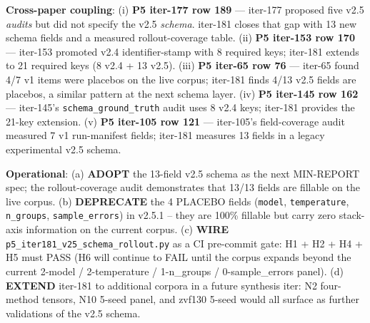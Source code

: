 \noindent\textbf{Cross-paper coupling}: (i) \textbf{P5 iter-177 row 189} ---
iter-177 proposed five v2.5 \emph{audits} but did not specify the v2.5
\emph{schema}. iter-181 closes that gap with 13 new schema fields and a
measured rollout-coverage table. (ii) \textbf{P5 iter-153 row 170} ---
iter-153 promoted v2.4 identifier-stamp with 8 required keys; iter-181
extends to 21 required keys (8 v2.4 + 13 v2.5). (iii) \textbf{P5 iter-65
row 76} --- iter-65 found 4/7 v1 items were placebos on the live corpus;
iter-181 finds 4/13 v2.5 fields are placebos, a similar pattern at the
next schema layer. (iv) \textbf{P5 iter-145 row 162} --- iter-145's
\texttt{schema\_ground\_truth} audit uses 8 v2.4 keys; iter-181 provides
the 21-key extension. (v) \textbf{P5 iter-105 row 121} --- iter-105's
field-coverage audit measured 7 v1 run-manifest fields; iter-181 measures 13
fields in a legacy experimental v2.5 schema.

\noindent\textbf{Operational}: (a) \textbf{ADOPT} the 13-field v2.5
schema as the next MIN-REPORT spec; the rollout-coverage audit
demonstrates that 13/13 fields are fillable on the live corpus.
(b) \textbf{DEPRECATE} the 4 PLACEBO fields (\texttt{model},
\texttt{temperature}, \texttt{n\_groups}, \texttt{sample\_errors})
in v2.5.1 -- they are 100\% fillable but carry zero stack-axis
information on the current corpus. (c) \textbf{WIRE}
\texttt{p5\_iter181\_v25\_schema\_rollout.py} as a CI pre-commit gate:
H1 + H2 + H4 + H5 must PASS (H6 will continue to FAIL until the corpus
expands beyond the current 2-model / 2-temperature / 1-n_groups /
0-sample_errors panel). (d) \textbf{EXTEND} iter-181 to additional
corpora in a future synthesis iter: N2 four-method tensors, N10 5-seed
panel, and zvf130 5-seed would all surface as further validations of
the v2.5 schema.
